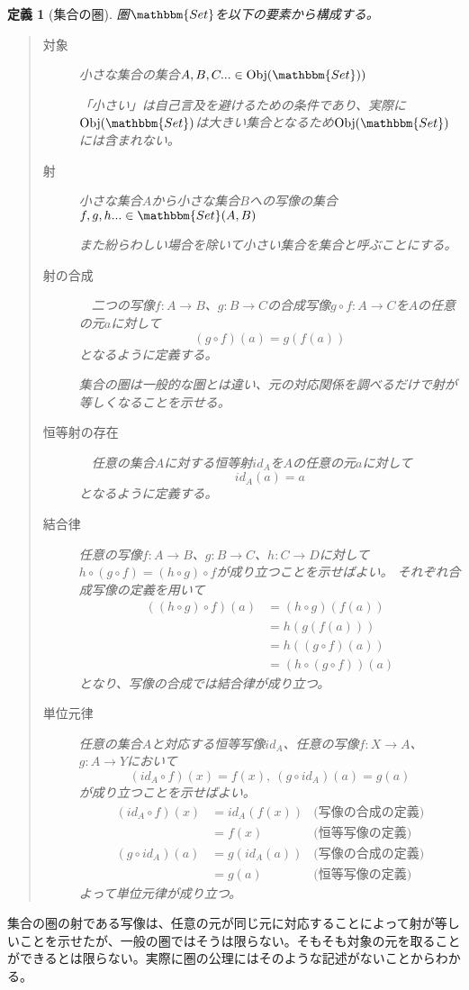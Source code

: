 \documentclass[dvipdfmx]{jsarticle}
\newcommand{\cat}[1]{\mathbbm{#1}}
\newcommand{\arrow}{\rightarrow}
\newcommand{\obj}[1]{\mathrm{Obj}(\cat{#1})}
\newcommand{\mor}[3]{#1:#2\arrow #3}
\newcommand{\arset}[3]{\cat{#1}(#2,#3)}
\newtheorem{define}{定義}[section]
\numberwithin{proof}{subsection}
\numberwithin{prop}{subsection}
\numberwithin{define}{subsection}
\begin{document}
	\begin{define}[集合の圏]
		圏$\cat{Set}$を以下の要素から構成する。
		\begin{quote}
			\begin{description}
				\item[対象] 小さな集合の集合$A,B,C...\in\obj{Set})$

				「小さい」は自己言及を避けるための条件であり、実際に$\obj{Set}$は大きい集合となるため$\obj{Set}$には含まれない。
				\item[射] 小さな集合$A$から小さな集合$B$への写像の集合$f,g,h...\in\arset{Set}{A}{B}$

				また紛らわしい場合を除いて小さい集合を集合と呼ぶことにする。
				\item[射の合成] 　二つの写像$\mor{f}{A}{B}$、$\mor{g}{B}{C}$の合成写像$\mor{g\circ f}{A}{C}$を$A$の任意の元$a$に対して\[(g\circ f)(a)=g(f(a))\]となるように定義する。

				集合の圏は一般的な圏とは違い、元の対応関係を調べるだけで射が等しくなることを示せる。
				\item[恒等射の存在]　任意の集合$A$に対する恒等射$id_A$を$A$の任意の元$a$に対して\[id_A(a)=a\]となるように定義する。
				\item[結合律] 任意の写像$\mor{f}{A}{B}$、$\mor{g}{B}{C}$、$\mor{h}{C}{D}$に対して$h\circ(g\circ f)=(h\circ g)\circ f$が成り立つことを示せばよい。
				それぞれ合成写像の定義を用いて
				\begin{align*}
					((h\circ g)\circ f)(a)&=(h\circ g)(f(a))\\
					&=h(g(f(a)))\\
					&=h((g\circ f)(a))\\
					&=(h\circ(g\circ f))(a)
				\end{align*}
				となり、写像の合成では結合律が成り立つ。
				\item[単位元律] 任意の集合$A$と対応する恒等写像$id_A$、任意の写像$\mor{f}{X}{A}$、$\mor{g}{A}{Y}$において\[(id_A\circ f)(x)=f(x),\ (g\circ id_A)(a)=g(a)\]が成り立つことを示せばよい。
				\begin{align*}
					(id_A\circ f)(x)&=id_A(f(x))&\text{(写像の合成の定義)}\\
					&=f(x)&\text{{(恒等写像の定義)}}\\
					(g\circ id_A)(a)&=g(id_A(a))&\text{(写像の合成の定義)}\\
					&=g(a)&\text{{(恒等写像の定義)}}
				\end{align*}
				よって単位元律が成り立つ。
			\end{description}
		\end{quote}
	\end{define}
	集合の圏の射である写像は、任意の元が同じ元に対応することによって射が等しいことを示せたが、一般の圏ではそうは限らない。そもそも対象の元を取ることができるとは限らない。実際に圏の公理にはそのような記述がないことからわかる。
\end{document}
